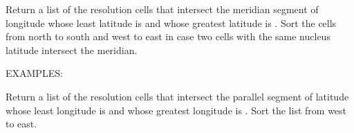 \documentclass[a4paper,12ptopenany,oneside,english]{sphinxmanual}
\begin{document}
\begin{fulllineitems}

\begin{fulllineitems}
\label{\detokenize{dggs:rhealpixdggs.dggs.RHEALPixDGGS.cells_from_meridian}}
\pysigstartsignatures
{}
\pysigstopsignatures
\sphinxAtStartPar
Return a list of the resolution  cells that intersect
the meridian segment of longitude  whose least latitude is
 and whose greatest latitude is .
Sort the cells from north to south and west to east in case
two cells with the same nucleus latitude intersect the
meridian.

\sphinxAtStartPar
EXAMPLES:

\begin{sphinxVerbatim}[commandchars=\\\{\}]
  
     
\PYG{p}{[}    \PYG{p}{]}
\end{sphinxVerbatim}

\end{fulllineitems}


\begin{fulllineitems}
\label{\detokenize{dggs:rhealpixdggs.dggs.RHEALPixDGGS.cells_from_parallel}}
\pysigstartsignatures
{}
\pysigstopsignatures
\sphinxAtStartPar
Return a list of the resolution  cells that intersect
the parallel segment of latitude  whose least longitude is
 and whose greatest longitude is .
Sort the list from west to east.


\end{fulllineitems}
\end{fulllineitems}
\end{document}
